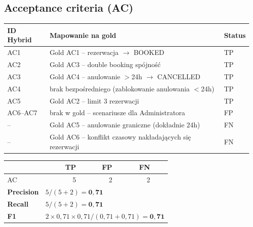 \documentclass[12pt,a4paper]{article}
\newcommand{\tp}[1]{\colorbox{tpcolor}{\small #1}}
\newcommand{\fp}[1]{\colorbox{fpcolor}{\small #1}}
\newcommand{\fn}[1]{\colorbox{fncolor}{\small #1}}
\begin{document}
\vspace{1em}
\subsection{Acceptance criteria (AC)}

\begin{tabular}{p{2.5cm} p{7cm} l}
\toprule
\textbf{ID Hybrid} & \textbf{Mapowanie na gold} & \textbf{Status} \\
\midrule
AC1 & Gold AC1 -- rezerwacja $\rightarrow$ BOOKED & \tp{TP} \\
AC2 & Gold AC3 -- double booking spójność & \tp{TP} \\
AC3 & Gold AC4 -- anulowanie $>$24h $\rightarrow$ CANCELLED & \tp{TP} \\
AC4 & brak bezpośredniego (zablokowanie anulowania $<$24h) & \tp{TP} \\
AC5 & Gold AC2 -- limit 3 rezerwacji & \tp{TP} \\
AC6--AC7 & brak w gold -- scenariusze dla Administratora & \fp{FP} \\
\midrule
-- & Gold AC5 -- anulowanie graniczne (dokładnie 24h) & \fn{FN} \\
-- & Gold AC6 -- konflikt czasowy nakładających się rezerwacji & \fn{FN} \\
\bottomrule
\end{tabular}

\vspace{0.5em}
\begin{tabular}{lrrrr}
\toprule
& \textbf{TP} & \textbf{FP} & \textbf{FN} & \\
\midrule
AC & 5 & 2 & 2 & \\
\midrule
\textbf{Precision} & \multicolumn{4}{l}{$5 / (5+2) = \mathbf{0{,}71}$} \\
\textbf{Recall}    & \multicolumn{4}{l}{$5 / (5+2) = \mathbf{0{,}71}$} \\
\textbf{F1}        & \multicolumn{4}{l}{$2 \times 0{,}71 \times 0{,}71 / (0{,}71+0{,}71) = \mathbf{0{,}71}$} \\
\bottomrule
\end{tabular}

\end{document}
